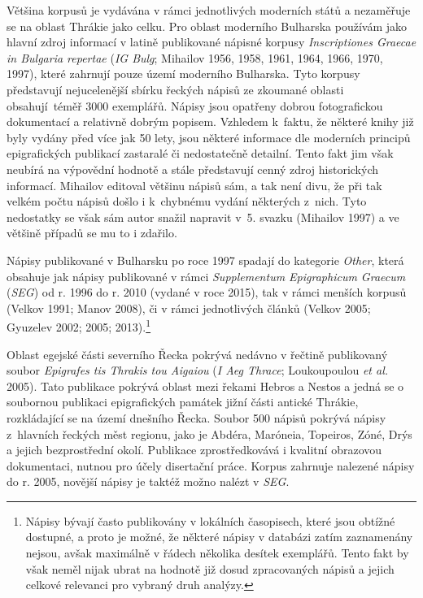 Většina korpusů je vydávána v rámci jednotlivých moderních států a nezaměřuje se na oblast Thrákie jako celku. Pro oblast moderního Bulharska používám jako hlavní zdroj informací v latině publikované nápisné korpusy {\em Inscriptiones Graecae in Bulgaria repertae} ({\em IG Bulg}; Mihailov 1956, 1958, 1961, 1964, 1966, 1970, 1997), které zahrnují pouze území moderního Bulharska. Tyto korpusy představují nejucelenější sbírku řeckých nápisů ze zkoumané oblasti obsahují~téměř 3000 exemplářů. Nápisy jsou opatřeny dobrou fotografickou dokumentací a relativně dobrým popisem. Vzhledem k~faktu, že některé knihy již byly vydány před více jak 50 lety, jsou některé informace dle moderních principů epigrafických publikací zastaralé či nedostatečně detailní. Tento fakt jim však neubírá na výpovědní hodnotě a stále představují cenný zdroj historických informací. Mihailov editoval většinu nápisů sám, a tak není divu, že při tak velkém počtu nápisů došlo i k~chybnému vydání některých z~nich. Tyto nedostatky se však sám autor snažil napravit v~5. svazku (Mihailov 1997) a ve většině případů se mu to i zdařilo.

Nápisy publikované v Bulharsku po roce 1997 spadají do kategorie {\em Other}, která obsahuje jak nápisy publikované v rámci {\em Supplementum Epigraphicum Graecum} ({\em SEG}) od r. 1996 do r. 2010 (vydané v roce 2015), tak v rámci menších korpusů (Velkov 1991; Manov 2008), či v rámci jednotlivých článků (Velkov 2005; Gyuzelev 2002; 2005; 2013).\footnote{Nápisy bývají často publikovány v lokálních časopisech, které jsou obtížné dostupné, a proto je možné, že některé nápisy v databázi zatím zaznamenány nejsou, avšak maximálně v řádech několika desítek exemplářů. Tento fakt by však neměl nijak ubrat na hodnotě již dosud zpracovaných nápisů a jejich celkové relevanci pro vybraný druh analýzy.}

Oblast egejské části severního Řecka pokrývá nedávno v řečtině publikovaný soubor {\em Epigrafes tis Thrakis tou Aigaiou} ({\em I Aeg Thrace}; Loukoupoulou {\em et al.} 2005). Tato publikace pokrývá oblast mezi řekami Hebros a Nestos a jedná se o soubornou publikaci epigrafických památek jižní části antické Thrákie, rozkládající se na území dnešního Řecka. Soubor 500 nápisů pokrývá nápisy z~hlavních řeckých měst regionu, jako je Abdéra, Maróneia, Topeiros, Zóné, Drýs a jejich bezprostřední okolí. Publikace zprostředkovává i kvalitní obrazovou dokumentaci, nutnou pro účely disertační práce. Korpus zahrnuje nalezené nápisy do r. 2005, novější nápisy je taktéž možno nalézt v {\em SEG}.

